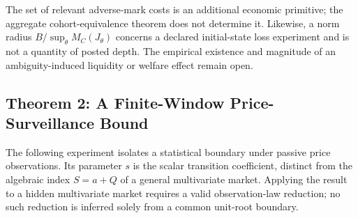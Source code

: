 \documentclass[12pt]{article}
\theoremstyle{definition}
\theoremstyle{remark}
\begin{document}
The set of relevant adverse-mark costs is an additional economic primitive; the aggregate cohort-equivalence theorem does not determine it. Likewise, a norm radius $B/\sup_\theta M_C(J_\theta)$ concerns a declared initial-state loss experiment and is not a quantity of posted depth. The empirical existence and magnitude of an ambiguity-induced liquidity or welfare effect remain open.


\subsection{Theorem 2: A Finite-Window Price-Surveillance Bound}
The following experiment isolates a statistical boundary under passive price observations. Its parameter $s$ is the scalar transition coefficient, distinct from the algebraic index $S=a+Q$ of a general multivariate market. Applying the result to a hidden multivariate market requires a valid observation-law reduction; no such reduction is inferred solely from a common unit-root boundary.
\end{document}
